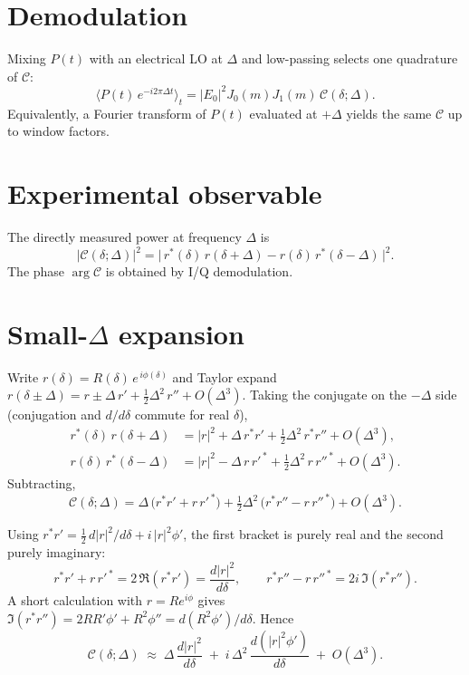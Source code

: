 \documentclass[aps,pra, onecolumn,superscriptaddress,nopacs,floatfix, showkeys, notitlepage]{revtex4-1}
\begin{document}
\section{Demodulation}

Mixing $P(t)$ with an electrical LO at $\Delta$ and low-passing selects
one quadrature of $\mathcal{C}$:
\begin{equation}
    \big\langle P(t)\, e^{-i 2\pi \Delta t}\big\rangle_t
    = |E_0|^2 J_0(m) J_1(m)\,\mathcal{C}(\delta;\Delta).
\end{equation}
Equivalently, a Fourier transform of $P(t)$ evaluated at $+\Delta$ yields
the same $\mathcal{C}$ up to window factors.

\section{Experimental observable}

The directly measured power at frequency $\Delta$ is
\begin{equation}
    |\mathcal{C}(\delta;\Delta)|^2
    = \big|\,r^*(\delta)\,r(\delta+\Delta) - r(\delta)\,r^*(\delta-\Delta)\,\big|^2.
\end{equation}
The phase $\arg\mathcal{C}$ is obtained by I/Q demodulation.

\section{Small-$\Delta$ expansion}

Write $r(\delta) = R(\delta)\, e^{\,i\phi(\delta)}$ and Taylor expand
$r(\delta\pm\Delta) = r \pm \Delta\, r' + \tfrac{1}{2}\Delta^2\, r'' + O(\Delta^3)$.
Taking the conjugate on the $-\Delta$ side (conjugation and
$d/d\delta$ commute for real $\delta$),
\begin{align}
    r^*(\delta)\,r(\delta+\Delta)
    &= |r|^2 + \Delta\, r^* r' + \tfrac{1}{2}\Delta^2\, r^* r'' + O(\Delta^3), \\
    r(\delta)\,r^*(\delta-\Delta)
    &= |r|^2 - \Delta\, r\, r'^{\,*} + \tfrac{1}{2}\Delta^2\, r\, r''^{\,*} + O(\Delta^3).
\end{align}
Subtracting,
\begin{equation}
    \mathcal{C}(\delta;\Delta)
    = \Delta\,\big(r^* r' + r\, r'^{\,*}\big)
    + \tfrac{1}{2}\Delta^2\,\big(r^* r'' - r\, r''^{\,*}\big)
    + O(\Delta^3).
\end{equation}

Using $r^* r' = \tfrac{1}{2}\,d|r|^2/d\delta + i\,|r|^2 \phi'$, the first
bracket is purely real and the second purely imaginary:
\begin{equation}
    r^* r' + r\, r'^{\,*} = 2\,\Re(r^* r') = \frac{d|r|^2}{d\delta}, \qquad
    r^* r'' - r\, r''^{\,*} = 2i\,\Im(r^* r'').
\end{equation}
A short calculation with $r = R e^{i\phi}$ gives
$\Im(r^* r'') = 2 R R' \phi' + R^2 \phi'' = d(R^2 \phi')/d\delta$. Hence
\begin{equation}
\boxed{\;
    \mathcal{C}(\delta;\Delta)
    \;\approx\; \Delta\,\frac{d|r|^2}{d\delta}
    \;+\; i\,\Delta^2\,\frac{d\!\left(|r|^2 \phi'\right)}{d\delta}
    \;+\; O(\Delta^3).
\;}
\end{equation}
\end{document}
